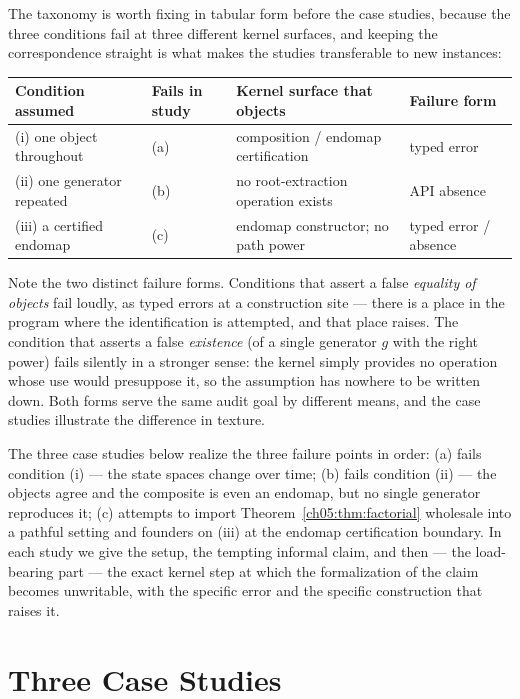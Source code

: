 The taxonomy is worth fixing in tabular form before the case studies,
because the three conditions fail at three different kernel surfaces, and
keeping the correspondence straight is what makes the studies
transferable to new instances:

\begin{center}
\small
\begin{tabular}{@{}llll@{}}
\toprule
Condition assumed & Fails in study & Kernel surface that objects &
Failure form \\
\midrule
(i) one object throughout & (a) & composition / endomap certification &
typed error \\
(ii) one generator repeated & (b) & no root-extraction operation exists &
API absence \\
(iii) a certified endomap & (c) & endomap constructor; no path power &
typed error / absence \\
\bottomrule
\end{tabular}
\end{center}

Note the two distinct failure forms. Conditions that assert a false
\emph{equality of objects} fail loudly, as typed errors at a
construction site --- there is a place in the program where the
identification is attempted, and that place raises. The condition that
asserts a false \emph{existence} (of a single generator $g$ with the
right power) fails silently in a stronger sense: the kernel simply
provides no operation whose use would presuppose it, so the assumption
has nowhere to be written down. Both forms serve the same audit goal by
different means, and the case studies illustrate the difference in
texture.

The three case studies below realize the three failure points in order:
(a) fails condition (i) --- the state spaces change over time; (b) fails
condition (ii) --- the objects agree and the composite is even an endomap,
but no single generator reproduces it; (c) attempts to import
Theorem~\ref{ch05:thm:factorial} wholesale into a pathful setting and
founders on (iii) at the endomap certification boundary. In each study we
give the setup, the tempting informal claim, and then --- the load-bearing
part --- the exact kernel step at which the formalization of the claim
becomes unwritable, with the specific error and the specific construction
that raises it.

\section{Three Case Studies}
\label{ch06:sec:cases}

